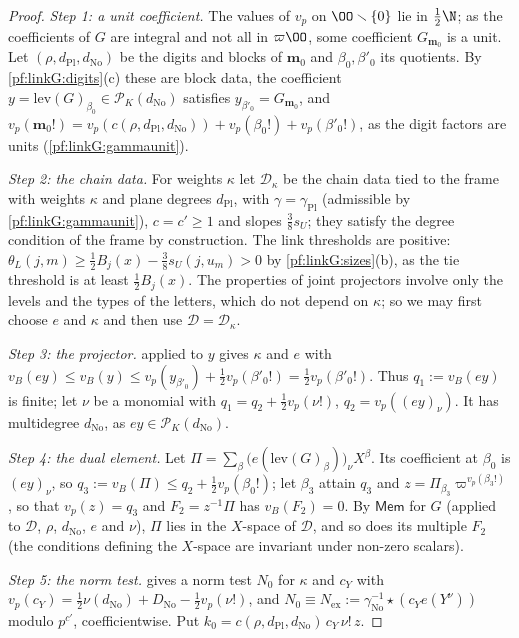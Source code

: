 \begin{proof}
\emph{Step 1: a unit coefficient.} The values of $v_p$ on $\OO\smallsetminus\{0\}$ lie in $\frac12\N$; as the coefficients of $G$ are
integral and not all in $\varpi\OO$, some coefficient $G_{\mathbf m_0}$ is a unit. Let $(\rho,d_{\mathrm{Pl}},d_{\mathrm{No}})$ be the digits and
blocks of $\mathbf m_0$ and $\beta_0,\beta'_0$ its quotients. By \cref{pf:linkG:digits}(c) these are block data, the coefficient
$y=\mathrm{lev}(G)_{\beta_0}\in\mathcal P_K(d_{\mathrm{No}})$ satisfies $y_{\beta'_0}=G_{\mathbf m_0}$, and
$v_p(\mathbf m_0!)=v_p(c(\rho,d_{\mathrm{Pl}},d_{\mathrm{No}}))+v_p(\beta_0!)+v_p(\beta'_0!)$, as the digit factors are units
(\cref{pf:linkG:gammaunit}).

\emph{Step 2: the chain data.} For weights $\kappa$ let $\mathcal D_\kappa$ be the chain data tied to the frame with weights $\kappa$ and
plane degrees $d_{\mathrm{Pl}}$, with $\gamma=\gamma_{\mathrm{Pl}}$ (admissible by \cref{pf:linkG:gammaunit}), $c=c'\ge1$ and slopes
$\frac38s_U$; they satisfy the degree condition of the frame by construction. The link thresholds are positive:
$\theta_L(j,m)\ge\frac12B_j(x)-\frac38s_U(j,u_m)>0$ by \cref{pf:linkG:sizes}(b), as the tie threshold is at least $\frac12B_j(x)$. The
properties of joint projectors involve only the levels and the types of the letters, which do not depend on $\kappa$; so we may first
choose $e$ and $\kappa$ and then use $\mathcal D=\mathcal D_\kappa$.

\emph{Step 3: the projector.}  applied to $y$ gives $\kappa$ and $e$ with $v_B(ey)\le v_B(y)\le
v_p(y_{\beta'_0})+\frac12v_p(\beta'_0!)=\frac12v_p(\beta'_0!)$. Thus $q_1:=v_B(ey)$ is finite; let $\nu$ be a monomial with
$q_1=q_2+\frac12v_p(\nu!)$, $q_2=v_p((ey)_\nu)$. It has multidegree $d_{\mathrm{No}}$, as $ey\in\mathcal P_K(d_{\mathrm{No}})$.

\emph{Step 4: the dual element.} Let $\Pi=\sum_\beta\bigl(e(\mathrm{lev}(G)_\beta)\bigr)_\nu X^\beta$. Its coefficient at $\beta_0$ is $(ey)_\nu$, so
$q_3:=v_B(\Pi)\le q_2+\frac12v_p(\beta_0!)$; let $\beta_3$ attain $q_3$ and $z=\Pi_{\beta_3}\varpi^{v_p(\beta_3!)}$, so that $v_p(z)=q_3$ and
$F_2=z^{-1}\Pi$ has $v_B(F_2)=0$. By $\mathsf{Mem}$ for $G$ (applied to $\mathcal D$, $\rho$, $d_{\mathrm{No}}$, $e$ and $\nu$), $\Pi$ lies in the
$X$-space of $\mathcal D$, and so does its multiple $F_2$ (the conditions defining the $X$-space are invariant under non-zero scalars).

\emph{Step 5: the norm test.}  gives a norm test $N_0$ for $\kappa$ and $c_Y$ with
$v_p(c_Y)=\frac12\nu(d_{\mathrm{No}})+D_{\mathrm{No}}-\frac12v_p(\nu!)$, and $N_0\equiv N_{\mathrm{ex}}:=\gamma_{\mathrm{No}}^{-1}\star(c_Ye(Y^\nu))$
modulo $p^{c'}$, coefficientwise. Put $k_0=c(\rho,d_{\mathrm{Pl}},d_{\mathrm{No}})\,c_Y\,\nu!\,z$.


\end{proof}

